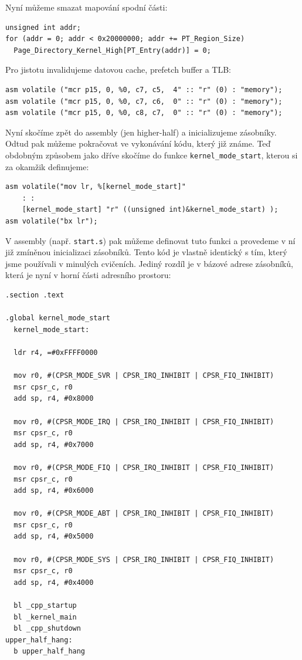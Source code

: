 \documentclass{article}
\begin{document}
Nyní můžeme smazat mapování spodní části:
\begin{lstlisting}
unsigned int addr;
for (addr = 0; addr < 0x20000000; addr += PT_Region_Size)
  Page_Directory_Kernel_High[PT_Entry(addr)] = 0;
\end{lstlisting}

Pro jistotu invalidujeme datovou cache, prefetch buffer a TLB:
\begin{lstlisting}
asm volatile ("mcr p15, 0, %0, c7, c5,  4" :: "r" (0) : "memory");
asm volatile ("mcr p15, 0, %0, c7, c6,  0" :: "r" (0) : "memory");
asm volatile ("mcr p15, 0, %0, c8, c7,  0" :: "r" (0) : "memory");
\end{lstlisting}

Nyní skočíme zpět do assembly (jen higher-half) a inicializujeme zásobníky. Odtud pak můžeme pokračovat ve vykonávání kódu, který již známe. Teď obdobným způsobem jako dříve skočíme do funkce {\tt kernel\_mode\_start}, kterou si za okamžik definujeme:
\begin{lstlisting}
asm volatile("mov lr, %[kernel_mode_start]"
    : :
    [kernel_mode_start] "r" ((unsigned int)&kernel_mode_start) );
asm volatile("bx lr");
\end{lstlisting}

V assembly (např. {\tt start.s}) pak můžeme definovat tuto funkci a provedeme v ní již zmíněnou inicializaci zásobníků. Tento kód je vlastně identický s tím, který jsme používali v minulých cvičeních. Jediný rozdíl je v bázové adrese zásobníků, která je nyní v horní části adresního prostoru:
\begin{lstlisting}
.section .text

.global kernel_mode_start
  kernel_mode_start:

  ldr r4, =#0xFFFF0000

  mov r0, #(CPSR_MODE_SVR | CPSR_IRQ_INHIBIT | CPSR_FIQ_INHIBIT)
  msr cpsr_c, r0
  add sp, r4, #0x8000

  mov r0, #(CPSR_MODE_IRQ | CPSR_IRQ_INHIBIT | CPSR_FIQ_INHIBIT)
  msr cpsr_c, r0
  add sp, r4, #0x7000

  mov r0, #(CPSR_MODE_FIQ | CPSR_IRQ_INHIBIT | CPSR_FIQ_INHIBIT)
  msr cpsr_c, r0
  add sp, r4, #0x6000

  mov r0, #(CPSR_MODE_ABT | CPSR_IRQ_INHIBIT | CPSR_FIQ_INHIBIT)
  msr cpsr_c, r0
  add sp, r4, #0x5000

  mov r0, #(CPSR_MODE_SYS | CPSR_IRQ_INHIBIT | CPSR_FIQ_INHIBIT)
  msr cpsr_c, r0
  add sp, r4, #0x4000

  bl _cpp_startup
  bl _kernel_main
  bl _cpp_shutdown
upper_half_hang:
  b upper_half_hang
\end{lstlisting}
\end{document}
